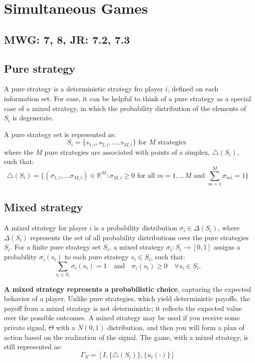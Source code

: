 \documentclass{article}
\begin{document}
\section{Simultaneous Games}
\subsection{MWG: 7, 8, JR: 7.2, 7.3}

\subsection{Pure strategy}

A pure strategy is a deterministic strategy fro player $i$, defined on each information set. For ease, it can be helpful to think of a pure strategy as a special case of a mixed strategy, in which the probability distribution of the elements of $S_i$ is degenerate. 

A pure strategy set is represented as: \[
S_i = \{ s_{1,i}, s_{2,i},..., s_{M,i}\} \text{ for } M \text{ strategies }
\]
where the $M$ pure strategies are associated with points of a simplex, $\triangle(S_i)$, such that: \[
\triangle(S_i) = \{(\sigma_{1,i},...\sigma_{M,i}) \in \mathbb{R}^M : \sigma_{M,i} \geq 0 \text{ for all } m = 1,...M \text{ and } \sum^{M}_{m=1} \sigma_{mi} = 1 \}
\]


\subsection{Mixed strategy}
A mixed strategy for player \(i\) is a probability distribution \(\sigma_i \in \Delta(S_i)\), where \(\Delta(S_i)\) represents the set of all probability distributions over the pure strategies \(S_i\). For a finite pure strategy set \(S_i\), a mixed strategy \(\sigma_i : S_i \to [0, 1]\) assigns a probability \(\sigma_i(s_i)\) to each pure strategy \(s_i \in S_i\), such that:
\[
\sum_{s_i \in S_i} \sigma_i(s_i) = 1 \quad \text{and} \quad \sigma_i(s_i) \geq 0 \quad \forall s_i \in S_i.
\]

\noindent \textbf{A mixed strategy represents a probabilistic choice}, capturing the expected behavior of a player. Unlike pure strategies, which yield deterministic payoffs, the payoff from a mixed strategy is not deterministic; it reflects the expected value over the possible outcomes. A mixed strategy may be used if you receive some private signal, $\Theta$ with a $N(0,1)$ distribution, and then you will form a plan of action based on the realization of the signal. The game, with a mixed strategy, is still represented as: \[
\Gamma_{N} = [I, \{\triangle(S_i)\}, \{u_i(\cdot)\}]
\]
\end{document}
